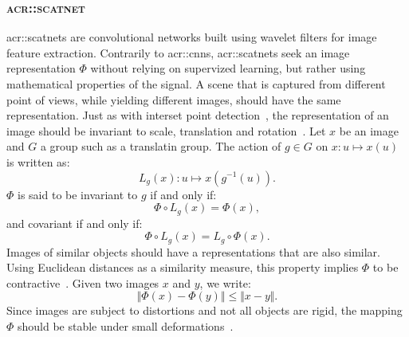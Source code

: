         \subsubsection{\textsc{\acrlong*{acr::scatnet}}}
            \glspl{acr::scatnet} are convolutional networks built using wavelet filters for image feature extraction.
            Contrarily to \glspl{acr::cnn}, \glspl{acr::scatnet} seek an image representation $\Phi$ without relying on supervized learning, but rather using mathematical properties of the signal.
            A scene that is captured from different point of views, while yielding different images, should have the same representation.
            Just as with interset point detection~\parencite{harris1988combined,lowe1999object}, the representation of an image should be invariant to scale, translation and rotation~\parencite{mallat2012group,sifre2013rotation,bruna2013invariant}.
            Let $x$ be an image and $G$ a group such as a translatin group.
            The action of $g\in G$ on $x: u \mapsto x(u)$ is written as:
            \begin{equation}
                \label{eq::action_group}
                L_g(x): u \mapsto x\left(g^{-1}(u)\right).
            \end{equation}
            $\Phi$ is said to be invariant to $g$ if and only if:
            \begin{equation}
                \label{eq::invariance}
                \Phi\circ L_g\left(x\right) = \Phi(x),
            \end{equation}
            and covariant if and only if:
            \begin{equation}
                \label{eq::covariance}
                \Phi\circ L_g\left(x\right) = L_g\circ\Phi(x).
            \end{equation}
            Images of similar objects should have a representations that are also similar.
            Using Euclidean distances as a similarity measure, this property implies $\Phi$ to be contractive~\parencite{bruna2013invariant}.
            Given two images $x$ and $y$, we write:
            \begin{equation}
                \label{eq::contractive}
                \Vert \Phi(x) - \Phi(y) \Vert \leq \Vert x-y \Vert.
            \end{equation}
            Since images are subject to distortions and not all objects are rigid, the mapping $\Phi$ should be stable under small deformations~\parencite{bruna2013invariant,sifre2013rotation,mallat2012group}.
